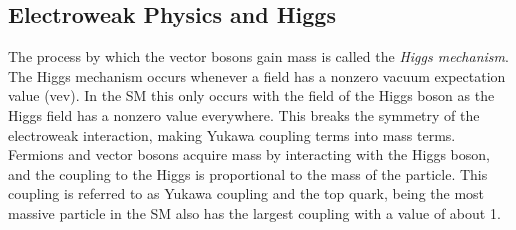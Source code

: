 \subsection{Electroweak Physics and Higgs} %
	
		The process by which the vector bosons gain mass is called the \textit{Higgs mechanism}.  The Higgs mechanism occurs whenever a field has a nonzero vacuum expectation value (vev).  In the SM this only occurs with the field of the Higgs boson as the Higgs field has a nonzero value everywhere.  This breaks the symmetry of the electroweak interaction, making Yukawa coupling terms into mass terms.  \\%
		
		Fermions and vector bosons acquire mass by interacting with the Higgs boson, and the coupling to the Higgs is proportional to the mass of the particle.  This coupling is referred to as Yukawa coupling and the top quark, being the most massive particle in the SM also has the largest coupling with a value of about 1. \\
		
